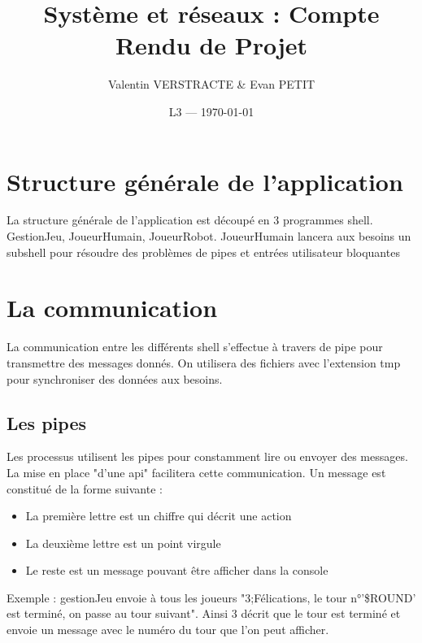 \documentclass{article}
\title{Système et réseaux : Compte Rendu de Projet} %
\author{Valentin VERSTRACTE \& Evan PETIT}
\date{L3 --- \today} %
\begin{document}
\maketitle %



\section{Structure générale de l'application}
La structure générale de l'application est découpé en 3 programmes shell. GestionJeu, JoueurHumain, JoueurRobot. JoueurHumain lancera aux besoins un subshell pour résoudre des problèmes de pipes et entrées utilisateur bloquantes

\section{La communication}
La communication entre les différents shell s'effectue à travers de pipe pour transmettre des messages donnés. On utilisera des fichiers avec l'extension tmp pour synchroniser des données aux besoins. 

\subsection{Les pipes}
Les processus utilisent les pipes pour constamment lire ou envoyer des messages. La mise en place "d'une api" facilitera cette communication. Un message est constitué de la forme suivante :

\begin{itemize}
\item La première lettre est un chiffre qui décrit une action  
\item La deuxième lettre est un point virgule
\item Le reste est un message pouvant être afficher dans la console 
\end{itemize}

Exemple : gestionJeu envoie à tous les joueurs "3;Félications, le tour n°'\$ROUND' est terminé, on passe au tour suivant". Ainsi 3 décrit que le tour est terminé et envoie un message avec le numéro du tour que l'on peut afficher. 
\end{document}
